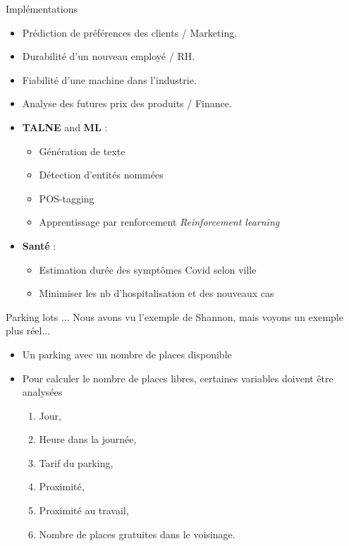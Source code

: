 \documentclass[aspectratio=169,xcolor=dvipsnames, t]{beamer}
\begin{document}
\begin{frame}{Implémentations}
	
	\begin{itemize}
		\item Prédiction de préférences des clients / Marketing.
		\item Durabilité d'un nouveau employé / RH.
		\item Fiabilité d'une machine dans l'industrie.
		\item Analyse des futures prix des produits / Finance.
		\item \textbf{TALNE} and \textbf{ML} :
		\begin{itemize}
			\item Génération de texte
			\item Détection d'entités nommées
			\item POS-tagging
			\item Apprentissage par renforcement \textit{Reinforcement learning}
		\end{itemize}
		
		\item \textbf{Santé} :
		\begin{itemize}
			\item Estimation durée des symptômes Covid selon ville
			\item Minimiser les nb d'hospitalisation et des nouveaux cas
		\end{itemize}
		
	\end{itemize}
	
\end{frame}


\begin{frame}{Parking lots ...}
	Nous avons vu l'exemple de Shannon, mais voyons un exemple plus réel...
	\begin{itemize}
		\item Un parking avec un nombre de places disponible
		\item Pour calculer le nombre de places libres, certaines variables doivent être analysées
		\begin{enumerate}
			\item Jour,
			\item Heure dans la journée,
			\item Tarif du parking,
			\item Proximité,
			\item Proximité au travail,
			\item Nombre de places gratuites dans le voisinage.
		\end{enumerate}
	\end{itemize}
\end{frame}
\end{document}
